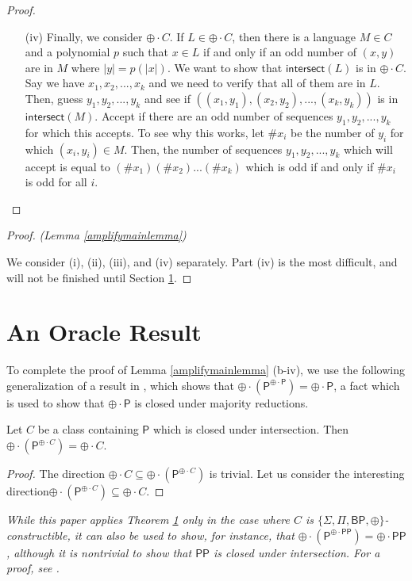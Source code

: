 \documentclass[11pt]{article}
\newcommand{\bp}{\textsf{BP}}
\newcommand{\parity}{\oplus}
\newcommand{\p}{\textsf{P}}
\newcommand{\pp}{\textsf{PP}}
\newcommand{\intersect}{\textsf{intersect}}
\begin{document}
\begin{proof}
\begin{enumerate}
\item[(iv)] Finally, we consider $\parity \cdot C$. If $L \in \parity \cdot C$, then there is a language $M \in C$ and a polynomial $p$ such that $x\in L$ if and only if an odd number of $(x,y)$ are in $M$ where $|y| = p(|x|)$. We want to show that $\intersect(L)$ is in $\parity \cdot C$. Say we have $x_1,x_2,...,x_k$ and we need to verify that all of them are in $L$. Then, guess $y_1,y_2,...,y_k$ and see if $((x_1,y_1),(x_2,y_2),...,(x_k,y_k))$ is in $\intersect(M)$. Accept if there are an odd number of sequences $y_1,y_2,...,y_k$ for which this accepts. To see why this works, let $\# x_i$ be the number of $y_i$ for which $(x_i, y_i) \in M$. Then, the number of sequences $y_1,y_2,...,y_k$ which will accept is equal to $(\# x_1)(\# x_2)...(\# x_k)$ which is odd if and only if $\# x_i$ is odd for all $i$.
\end{enumerate}
\end{proof}

\begin{proof} \emph{(Lemma \ref{amplifymainlemma})}

We consider (i), (ii), (iii), and (iv) separately. Part (iv) is the most difficult, and will not be finished until Section \ref{oracle}.
\end{proof}

\section{An Oracle Result}\label{oracle}

To complete the proof of Lemma \ref{amplifymainlemma} (b-iv), we use the following generalization of a result in \cite{Toda}, which shows that $\parity \cdot (\p ^{\parity\cdot\p}) = \parity\cdot\p$, a fact which is used to show that $\parity \cdot \p$ is closed under majority reductions.

\begin{theorem}\label{oracleparityc}
Let $C$ be a class containing \emph{$\p$} which is closed under intersection. Then\linebreak \emph{$\parity \cdot (\p^{\parity \cdot C}) = \parity \cdot C$}.
\end{theorem}
\begin{proof}
The direction $\parity \cdot C \subseteq \parity \cdot (\p^{\parity \cdot C})$ is trivial. Let us consider the interesting direction\linebreak $\parity \cdot (\p^{\parity \cdot C})\subseteq \parity\cdot C$.
\end{proof}
\begin{remark}\emph{
While this paper applies Theorem \ref{oracle} only in the case where $C$ is $\{\Sigma,\Pi,\bp,\parity\}$-constructible, it can also be used to show, for instance, that $\parity \cdot (\p^{\parity \cdot \pp}) = \parity \cdot \pp$, although it is nontrivial to show that $\pp$ is closed under intersection. For a proof, see \cite{Beigel}.
}\end{remark}
\end{document}
